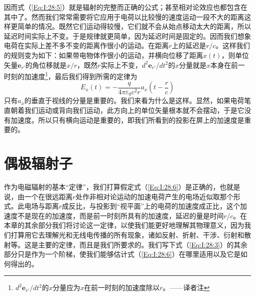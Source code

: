 因而式（\ref{Eq:I:28:5}）就是辐射的完整而正确的公式；甚至相对论效应也都包含在其中了。然而我们常常需要将它应用于电荷以比较慢的速度运动一段不大的距离这样更简单的情况。既然它们运动得较慢，它们就不会从始点移动太大的距离，所以延迟时间实际上不变。于是规律就更简单，因为延迟时间是固定的。因而我们想象电荷在实际上差不多不变的距离作很小的运动。在距离$r$上的延迟是$r/c$。这样我们的规则变为如下：如果带电物体作很小的运动，并横向位移了距离$x(t)$，则单位矢量$\boldsymbol{e}_{r'}$的角位移就是$x/r$，既然$r$实际上不变，$d^2\boldsymbol{e}_{r'}/dt^2$的$x$分量就是$x$本身在前一时刻的加速度\footnote{$d^2\boldsymbol{e}_{r'}/dt^2$的$x$分量应为$x$在前一时刻的加速度除以$r$。——译者注}，最后我们得到所需的定律为
\begin{equation}
    \label{Eq:I:28:6}
    E_x(t) = -\frac{q}{4\pi\varepsilon_0c^2r} a_x\left ( t-\frac{r}{c} \right )
\end{equation}
只有$a_x$的垂直于视线的分量是重要的。我们来看为什么是这样。显然，如果电荷笔直朝着我们运动或背向我们运动，此方向上的单位矢量根本就不会摆动，于是它没有加速度。所以只有横向运动是重要的，即我们所看到的投影在屏上的加速度是重要的。

\section{偶极辐射子}

作为电磁辐射的基本“定律”，我们打算假定式（\ref{Eq:I:28:6}）是正确的，也就是说，由一个在很远距离$r$处作非相对论运动的加速电荷产生的电场近似取那个形式。此电场与距离$r$成反比，与投影到“视平面”上的电荷的加速度成正比，这个加速度不是现在的加速度，而是前一时刻所具有的加速度，延迟的量是时间$r/c$。在本章的其余部分我们将讨论这一定律，以使我们能更好地理解其物理意义，因为我们打算用它去理解光和无线电传播的所有现象，诸如反射、折射、干涉、衍射和散射等。这是主要的定律，而且是我们所要求的。我们写下式（\ref{Eq:I:28:3}）的其余部分只是作为一个阶梯，使我们能够估计式（\ref{Eq:I:28:6}）在哪里适用以及它是如何得出的。

